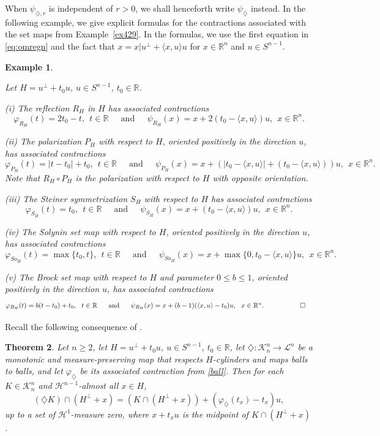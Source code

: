 \documentclass[12pt,reqno]{amsart}
\newcommand{\R}{{\mathbb R}}
\newcommand{\cK}{\mathcal K}
\newtheorem{thm}{Theorem}[section]
\newtheorem{ex}[thm]{Example}
\newcommand{\di}{\diamondsuit}
\numberwithin{equation}{section}
\begin{document}
When $\psi_{\di,r}$ is independent of $r>0$, we shall henceforth write $\psi_{\di}$ instead. In the following example, we give explicit formulas for the contractions associated with the set maps from Example~\ref{ex429}.  In the formulas, we use the first equation in \eqref{eq:omregn} and the fact that $x=x|u^{\perp}+\langle x,u\rangle u$ for $x\in\R^n$ and $u\in S^{n-1}$.

\begin{ex}\label{ex310}
{\em Let $H=u^{\perp}+t_0u$, $u\in S^{n-1}$, $t_0\in \R$.

(i) The reflection $R_{H}$ in $H$ has associated contractions
$$
\varphi_{R_H}(t)=2t_0-t,~~t\in\R~~\quad{\text{and}}~~\quad
\psi_{R_H}(x)=x+2(t_0-\langle x,u\rangle)u,~~x\in\R^n.
$$

(ii) The polarization $P_H$ with respect to $H$, oriented positively in the direction $u$, has associated contractions
\begin{equation}\label{f2}
\varphi_{P_H}(t)=|t-t_0|+t_0,~~t\in\R~~\quad{\text{and}}~~\quad
\psi_{P_H}(x)=x+(|t_0-\langle x,u\rangle|+(t_0-\langle x,u\rangle))u,~~x\in\R^n.
\end{equation}
Note that $R_H\circ P_H$ is the polarization with respect to $H$ with opposite orientation.

(iii) The Steiner symmetrization $S_H$ with respect to $H$ has associated contractions
$$
\varphi_{S_H}(t)=t_0,~~t\in\R~~\quad{\text{and}}~~\quad
\psi_{S_H}(x)=x+(t_0-\langle x,u\rangle)u,~~x\in\R^n.
$$

(iv) The Solynin set map with respect to $H$, oriented positively in the direction $u$, has associated contractions
\begin{equation}\label{f4}
\varphi_{So_H}(t)=\max\{t_0,t\},~~t\in\R~~\quad{\text{and}}~~\quad
\psi_{So_H}(x)=x+\max\{0,t_0- \langle x,u\rangle\}u,~~x\in\R^n.
\end{equation}

(v) The Brock set map with respect to $H$ and parameter $0\le b\le 1$, oriented positively in the direction $u$, has associated contractions
\begin{align*}
\varphi_{B_H}(t)&=b(t-t_0)+t_0,~~t\in\R~~\quad{\text{and}}~~\quad
\psi_{B_H}(x)=x+(b-1)(\langle x,u\rangle-t_0)u,~~x\in\R^n. ~~~~\quad\quad\qed
\end{align*}
}
\end{ex}

Recall the following consequence of \cite[Theorem~6.6]{BGGK1}.

\begin{thm}\label{thmm7}
Let $n\ge 2$, let $H=u^{\perp}+t_0u$, $u\in S^{n-1}$, $t_0\in \R$,
let $\di:{\mathcal{K}}^n_n \rightarrow {\mathcal{L}}^n$ be a monotonic and measure-preserving map that respects $H$-cylinders and maps balls to balls, and let $\varphi_{\di}$ be its associated contraction from \eqref{ball}. Then for each $K\in \cK^n_n$ and ${\mathcal{H}}^{n-1}$-almost all $x\in H$,
\begin{equation}\label{kseg}
(\di K)\cap (H^{\perp}+x)=(K\cap (H^{\perp}+x))+(\varphi_{\di}(t_x)-t_x) u,
\end{equation}
up to a set of ${\mathcal{H}}^1$-measure zero, where $x+t_xu$ is the midpoint of $K\cap (H^{\perp}+x)$.
\end{thm}
\end{document}
